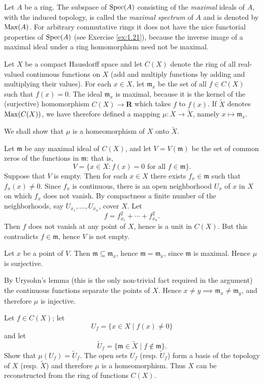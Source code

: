 \begin{exercise}
\label{ex:1.26}
Let $A$ be a ring.
The subspace of $\operatorname{Spec}(A)$ consisting of the \emph{maximal} ideals of $A$, with the induced topology, is called the \emph{maximal spectrum} of $A$ and is denoted by $\operatorname{Max}(A)$.
For arbitrary commutative rings it does not have the nice functorial properties of $\operatorname{Spec}(A)$ (see Exercise \ref{ex:1.21}), because the inverse image of a maximal ideal under a ring homomorphism need not be maximal.

Let $X$ be a compact Hausdorff space and let $C(X)$ denote the ring of all real-valued continuous functions on $X$ (add and multiply functions by adding and multiplying their values).
For each $x\in X$, let $\mathfrak m_x$ be the set of all $f\in C(X)$ such that $f(x)=0$.
The ideal $\mathfrak m_x$ is maximal, because it is the kernel of the (surjective) homomorphism $C(X)\to\mathbf R$ which takes $f$ to $f(x)$.
If $\tilde X$ denotes $\operatorname{Max}(C(X))$, we have therefore defined a mapping $\mu:X\to\tilde X$, namely $x\mapsto\mathfrak m_x$.

We shall show that $\mu$ is a homeomorphism of $X$ onto $\tilde X$.
\begin{rlist}
\item\label{ex:1.26.i}
Let $\mathfrak m$ be any maximal ideal of $C(X)$, and let $V=V(\mathfrak m)$ be the set of common zeros of the functions in $\mathfrak m$: that is,
\begin{equation*}
V = \{x\in X : f(x) = 0 \text{ for all } f\in\mathfrak m\}.
\end{equation*}
Suppose that $V$ is empty.
Then for each $x\in X$ there exists $f_x\in\mathfrak m$ such that $f_x(x)\neq 0$.
Since $f_x$ is continuous, there is an open neighborhood $U_x$ of $x$ in $X$ on which $f_x$ does not vanish.
By compactness a finite number of the neighborhoods, say $U_{x_1},\ldots,U_{x_n}$, cover $X$.
Let
\[
f = f_{x_1}^2 + \cdots + f_{x_n}^2.
\]
Then $f$ does not vanish at any point of $X$, hence is a unit in $C(X)$.
But this contradicts $f\in\mathfrak m$, hence $V$ is not empty.

Let $x$ be a point of $V$.
Then $\mathfrak m \subseteq \mathfrak m_x$, hence $\mathfrak m = \mathfrak m_x$, since $\mathfrak m$ is maximal.
Hence $\mu$ is surjective.
\item\label{ex:1.26.ii}
By Urysohn's lemma (this is the only non-trivial fact required in the argument) the continuous functions separate the points of $X$.
Hence $x\neq y\implies\mathfrak m_x\neq \mathfrak m_y$, and therefore $\mu$ is injective.
\item\label{ex:1.26.iii}
Let $f\in C(X)$; let
\[
U_f = \{x\in X \mid f(x)\neq 0\}
\]
and let
\[
\tilde U_f = \{\mathfrak m\in\tilde X \mid f\notin\mathfrak m\}.
\]
Show that $\mu(U_f)=\tilde U_f$.
The open sets $U_f$ (resp. $\tilde U_f$) form a basis of the topology of $X$ (resp. $\tilde X$) and therefore $\mu$ is a homeomorphism.
Thus $X$ can be reconstructed from the ring of functions $C(X)$.
\end{rlist}
\end{exercise}

